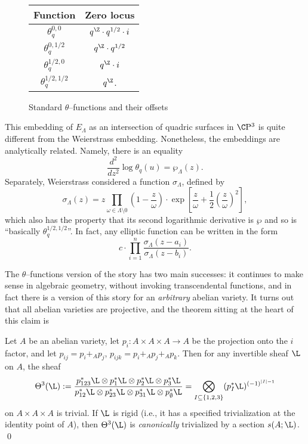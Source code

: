 \begin{figure}
\begin{center}
\begin{tabular}{@{}cc@{}} \toprule
Function & Zero locus \\
\midrule
$\theta_q^{0,0}$ & $q^{\Z} \cdot q^{1/2} \cdot i$ \\
$\theta_q^{0,1/2}$ & $q^{\Z} \cdot q^{1/2}$ \\
$\theta_q^{1/2,0}$ & $q^{\Z} \cdot i$ \\
$\theta_q^{1/2,1/2}$ & $q^{\Z}$. \\ \bottomrule
\end{tabular}
\end{center}
\caption{Standard $\theta$--functions and their offsets}\label{ThetaFunctionsTable}
\end{figure}

\begin{remark}
This embedding of $E_\Lambda$ as an intersection of quadric surfaces in $\CP^3$ is quite different from the Weierstrass embedding.  Nonetheless, the embeddings are analytically related.  Namely, there is an equality \[\frac{d^2}{dz^2} \log \theta_q(u) = \wp_\Lambda(z).\]  Separately, Weierstrass considered a function $\sigma_\Lambda$, defined by \[\sigma_\Lambda(z) = z \prod_{\omega \in \Lambda \setminus 0} \left( 1 - \frac{z}{\omega} \right) \cdot \exp \left[ \frac{z}{\omega} + \frac{1}{2} \left( \frac{z}{\omega} \right)^2 \right],\] which also has the property that its second logarithmic derivative is $\wp$ and so is ``basically $\theta_q^{1/2,1/2}$''.  In fact, any elliptic function can be written in the form \[c \cdot \prod_{i=1}^n \frac{\sigma_\Lambda(z - a_i)}{\sigma_\Lambda(z - b_i)}.\]
\end{remark}

The $\theta$--functions version of the story has two main successes: it continues to make sense in algebraic geometry, without invoking transcendental functions, and in fact there is a version of this story for an \emph{arbitrary} abelian variety.  It turns out that all abelian varieties are projective, and the theorem sitting at the heart of this claim is
\begin{corollary}\label{Theta3IsTrivial}
Let $A$ be an abelian variety, let $p_i: A \times A \times A \to A$ be the projection onto the $i${\th} factor, and let $p_{ij} = p_i +_A p_j$, $p_{ijk} = p_i +_A p_j +_A p_k$.  Then for any invertible sheaf $\L$ on $A$, the sheaf \[\Theta^3(\L) := \frac{p_{123}^* \L \otimes p_1^* \L \otimes p_2^* \L \otimes p_3^* \L}{p_{12}^* \L \otimes p_{23}^* \L \otimes p_{31}^* \L \otimes p_\emptyset^* \L} = \bigotimes_{I \subseteq \{1, 2, 3\}} (p_I^* \L)^{(-1)^{|I| - 1}}\] on $A \times A \times A$ is trivial.  If $\L$ is rigid (i.e., it has a specified trivialization at the identity point of $A$), then $\Theta^3(\L)$ is \emph{canonically} trivialized by a section $s(A; \L)$. \qed
\end{corollary}

